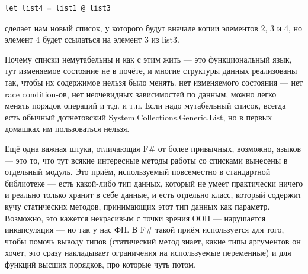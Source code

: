\documentclass{../../text-style}
\begin{document}
\begin{verbatim}
let list4 = list1 @ list3
\end{verbatim}

сделает нам новый список, у которого будут вначале копии элементов 2, 3 и 4, но элемент 4 будет ссылаться на элемент 3 из list3.

Почему списки немутабельны и как с этим жить --- это функциональный язык, тут изменяемое состояние не в почёте, и многие структуры данных реализованы так, чтобы их содержимое нельзя было менять. нет изменяемого состояния --- нет race condition-ов, нет неочевидных зависимостей по данным, можно легко менять порядок операций и т.д. и т.п. Если надо мутабельный список, всегда есть обычный дотнетовский System.Collections.Generic.List, но в первых домашках им пользоваться нельзя.

Ещё одна важная штука, отличающая F\# от более привычных, возможно, языков --- это то, что тут всякие интересные методы работы со списками вынесены в отдельный модуль. Это приём, используемый повсеместно в стандартной библиотеке --- есть какой-либо тип данных, который не умеет практически ничего и реально только хранит в себе данные, и есть отдельно класс, который содержит кучу статических методов, принимающих этот тип данных как параметр. Возможно, это кажется некрасивым с точки зрения ООП --- нарушается инкапсуляция --- но так у нас ФП. В F\# такой приём используется для того, чтобы помочь выводу типов (статический метод знает, какие типы аргументов он хочет, это сразу накладывает ограничения на используемые переменные) и для функций высших порядков, про которые чуть потом.
\end{document}
